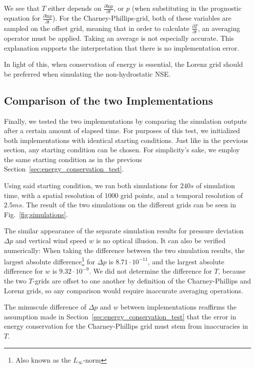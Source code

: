 We see that $T$ either depends on $\frac{\partial \text{ln}p}{\partial t}$, or $p$ (when substituting in the prognostic equation for $\frac{\partial \text{ln}p}{\partial t}$).
For the Charney-Phillips-grid, both of these variables are sampled on the offset grid, meaning that in order to calculate $\frac{\partial T}{\partial t}$, an averaging operator must be applied.
Taking an average is not especially accurate.
This explanation supports the interpretation that there is no implementation error.

In light of this, when conservation of energy is essential, the Lorenz grid should be preferred when simulating the non-hydrostatic NSE.

\subsection{Comparison of the two Implementations}
Finally, we tested the two implementations by comparing the simulation outputs after a certain amount of elapsed time.
For purposes of this test, we initialized both implementations with identical starting conditions.
Just like in the previous section, any starting condition can be chosen.
For simplicity's sake, we employ the same starting condition as in the previous Section~\ref{sec:energy_conservation_test}.

Using said starting condition, we ran both simulations for $240s$ of simulation time, with a spatial resolution of $1000$ grid points, and a temporal resolution of $2.5ms$.
The result of the two simulations on the different grids can be seen in Fig.~\ref{fig:simulations}.

The similar appearance of the separate simulation results for pressure deviation $\Delta p$ and vertical wind speed $w$ is no optical illusion.
It can also be verified numerically:
When taking the difference between the two simulation results, the largest absolute difference\footnote{Also known as the $L_\infty$-norm} for $\Delta p$ is $8.71\cdot 10^{-11}$, and the largest absolute difference for $w$ is $9.32\cdot 10^{-9}$.
We did not determine the difference for $T$, because the two $T$-grids are offset to one another by definition of the Charney-Phillips and Lorenz grids, so any comparison would require inaccurate averaging operations.

The minuscule difference of $\Delta p$ and $w$ between implementations reaffirms the assumption made in Section~\ref{sec:energy_conservation_test} that the error in energy conservation for the Charney-Phillips grid must stem from inaccuracies in $T$.

